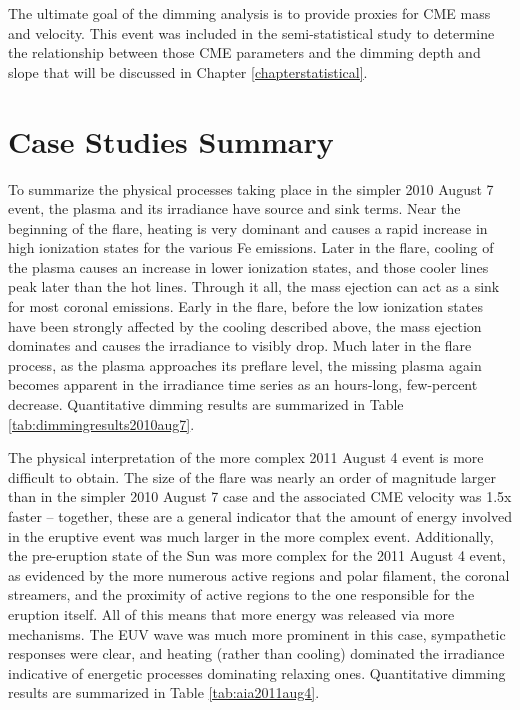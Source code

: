 The ultimate goal of the dimming analysis is to provide proxies for CME mass and velocity. This event was included in the semi-statistical study to determine the relationship between those CME parameters and the dimming depth and slope that will be discussed in Chapter \ref{chapterstatistical}. 


\section{Case Studies Summary}
To summarize the physical processes taking place in the simpler 2010 August 7 event, the plasma and its irradiance have source and sink terms. Near the beginning of the flare, heating is very dominant and causes a rapid increase in high ionization states for the various Fe emissions. Later in the flare, cooling of the plasma causes an increase in lower ionization states, and those cooler lines peak later than the hot lines. Through it all, the mass ejection can act as a sink for most coronal emissions. Early in the flare, before the low ionization states have been strongly affected by the cooling described above, the mass ejection dominates and causes the irradiance to visibly drop. Much later in the flare process, as the plasma approaches its preflare level, the missing plasma again becomes apparent in the irradiance time series as an hours-long, few-percent decrease. Quantitative dimming results are summarized in Table \ref{tab:dimmingresults2010aug7}. 

The physical interpretation of the more complex 2011 August 4 event is more difficult to obtain. The size of the flare was nearly an order of magnitude larger than in the simpler 2010 August 7 case and the associated CME velocity was 1.5x faster -- together, these are a general indicator that the amount of energy involved in the eruptive event was much larger in the more complex event. Additionally, the pre-eruption state of the Sun was more complex for the 2011 August 4 event, as evidenced by the more numerous active regions and polar filament, the coronal streamers, and the proximity of active regions to the one responsible for the eruption itself. All of this means that more energy was released via more mechanisms. The EUV wave was much more prominent in this case, sympathetic responses were clear, and heating (rather than cooling) dominated the irradiance indicative of energetic processes dominating relaxing ones. Quantitative dimming results are summarized in Table \ref{tab:aia2011aug4}. 